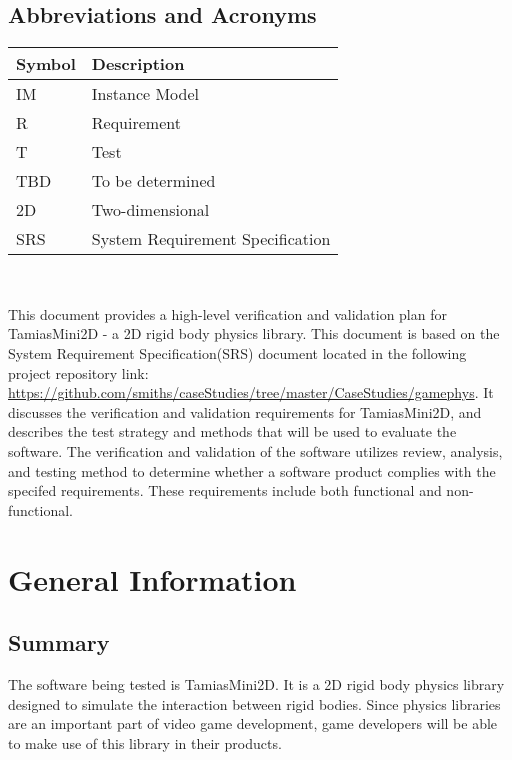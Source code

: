 \documentclass[12pt, titlepage]{article}
\begin{document}
\subsection{Abbreviations and Acronyms}
\begin{tabular}{l l} 
	\toprule		
	\textbf{Symbol} & \textbf{Description}\\
	\midrule 
	IM & Instance Model\\
	R & Requirement\\
	T & Test\\
	TBD & To be determined\\
	2D & Two-dimensional\\
	SRS & System Requirement Specification\\
	\bottomrule
\end{tabular}\\


\newpage

\tableofcontents

\listoftables

\listoffigures

\newpage


This document provides a high-level verification and validation plan for TamiasMini2D - a 2D rigid body physics library. This document is based on the System Requirement Specification(SRS) document located in the following project repository link: \url{https://github.com/smiths/caseStudies/tree/master/CaseStudies/gamephys}. It discusses the verification and validation requirements for TamiasMini2D, and describes the test strategy and methods that will be used to evaluate the software. The verification and validation of the software utilizes review, analysis, and testing method to determine whether a software product complies with the specifed requirements. These requirements include both functional and non-functional.

\section{General Information}

\subsection{Summary}
The software being tested is TamiasMini2D. It is a 2D rigid body physics library designed to simulate the interaction between rigid bodies. Since physics libraries are an important part of video game development, game developers will be able to make use of this library in their products.
\end{document}
